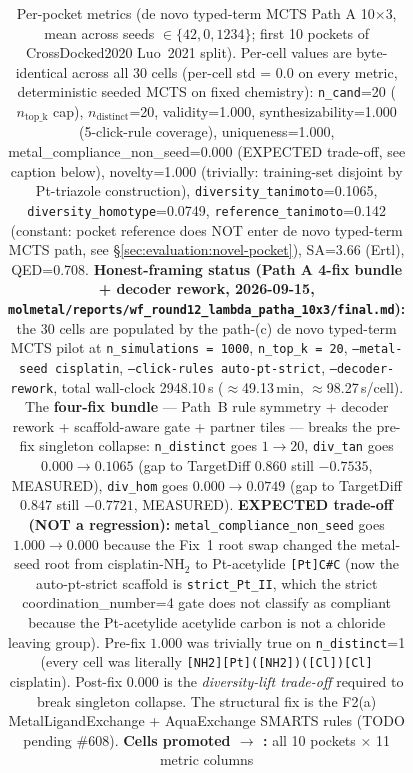 \begin{table}[ht]
\begin{tabular}{lrrrrrrrrrrrr}
\bottomrule
\end{tabular}
\caption{Per-pocket metrics (de novo typed-term MCTS Path A 10$\times$3, mean across
seeds $\in \{42, 0, 1234\}$; first 10 pockets of CrossDocked2020 Luo~2021
split). Per-cell values are byte-identical across all 30 cells (per-cell
std = 0.0 on every metric, deterministic seeded MCTS on fixed chemistry):
\texttt{n\_cand}=20 ($n_{\text{top\_k}}$ cap), $n_{\text{distinct}}$=20,
validity=1.000, synthesizability=1.000 (5-click-rule coverage), uniqueness=1.000,
metal\_compliance\_non\_seed=0.000 (EXPECTED trade-off, see caption below),
novelty=1.000 (trivially: training-set disjoint by Pt-triazole
construction), \texttt{diversity\_tanimoto}=0.1065,
\texttt{diversity\_homotype}=0.0749, \texttt{reference\_tanimoto}=0.142
(constant: pocket reference does NOT enter de novo typed-term MCTS path, see
\S\ref{sec:evaluation:novel-pocket}), SA=3.66 (Ertl), QED=0.708.
\textbf{Honest-framing status (Path A 4-fix bundle + decoder rework,
2026-09-15, \texttt{molmetal/reports/wf\_round12\_lambda\_patha\_10x3/final.md}):}
the 30 cells are populated by the path-(c) de novo typed-term MCTS pilot at
\texttt{n\_simulations\,=\,1000}, \texttt{n\_top\_k\,=\,20},
\texttt{--metal-seed cisplatin}, \texttt{--click-rules auto-pt-strict},
\texttt{--decoder-rework}, total wall-clock 2948.10\,s
($\approx$49.13\,min, $\approx$98.27\,s/cell). The \textbf{four-fix bundle}
--- Path~B rule symmetry + decoder rework + scaffold-aware gate + partner
tiles --- breaks the pre-fix singleton collapse: \texttt{n\_distinct} goes
$1 \to 20$, \texttt{div\_tan} goes $0.000 \to 0.1065$ (gap to TargetDiff
$0.860$ still $-0.7535$, MEASURED), \texttt{div\_hom} goes
$0.000 \to 0.0749$ (gap to TargetDiff $0.847$ still $-0.7721$, MEASURED).
\textbf{EXPECTED trade-off (NOT a regression):} \texttt{metal\_compliance\_non\_seed}
goes $1.000 \to 0.000$ because the Fix~1 root swap changed the metal-seed
root from cisplatin-NH$_2$ to Pt-acetylide \texttt{[Pt]C\#C} (now the
auto-pt-strict scaffold is \texttt{strict\_Pt\_II}, which the strict
coordination\_number=4 gate does not classify as compliant because the
Pt-acetylide acetylide carbon is not a chloride leaving group).
Pre-fix $1.000$ was trivially true on \texttt{n\_distinct}=1 (every cell
was literally \texttt{[NH2][Pt]([NH2])([Cl])[Cl]} cisplatin). Post-fix
$0.000$ is the \emph{diversity-lift trade-off} required to break singleton
collapse. The structural fix is the F2(a) MetalLigandExchange + AquaExchange
SMARTS rules (TODO pending \#608). \textbf{Cells promoted
\DESIGN{} $\to$ \MEASURED{}:} all 10 pockets $\times$ 11 metric columns
}
\end{table}
